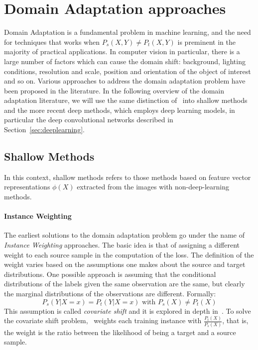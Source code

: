 \documentclass[../main.tex]{subfiles}
\begin{document}
    \section{Domain Adaptation approaches}\label{sec:related-word}
	Domain Adaptation is a fundamental problem in machine learning, and the need for techniques that works when
	$P_{s}(X, Y) \neq P_{t}(X, Y)$ is preminent in the majority of practical applications. In computer vision in particular,
	there is a large number of factors which can cause the domain shift: background, lighting conditions, resolution and scale,
	position and orientation of the object of interest and so on. Various approaches to address the domain adaptation problem
	have been proposed in the literature. In the following overview of the domain adaptation literature, we will use the same
	distinction of~\cite{DBLP:journals/corr/Csurka17} into shallow methods and the more recent deep methods, which employs
	deep learning models, in particular the deep convolutional networks described in Section~\ref{sec:deeplearning}.

    \subsection{Shallow Methods}
	In this context, shallow methods refers to those methods based on feature vector representations $\phi(X)$ extracted from
	the images with non-deep-learning methods.

	\paragraph{Instance Weighting}
	The earliest solutions to the domain adaptation problem go under the name
	of \textit{Instance Weighting} approaches.
	The basic idea is that of assigning a different weight to each source sample in the computation of the loss. The definition of the
	weight varies based on the assumptions one makes about the source and target distributions. One possible approach is assuming
	that the conditional distributions of the labels given the same observation are the same, but clearly the marginal distributions
	of the observations are different. Formally:
	$$ P_{s}(Y | X = x) = P_{t}(Y | X = x) \text{ with } P_{s}(X) \neq P_{t}(X) $$
	This assumption is called \textit{covariate shift} and it is explored in depth in~\cite{shimoidara2000}. To solve the covariate
	shift problem,~\cite{shimoidara2000} weights each training instance with $\frac{P_{t}(X)}{P_{s}(X)}$, that is, the weight is the
	ratio between the likelihood of being a target and a source sample.
\end{document}
